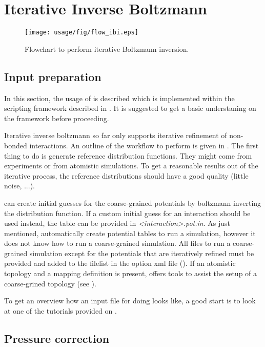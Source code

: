 \section{Iterative Inverse Boltzmann}
\begin{figure}
   \centering
   \texttt{[image: usage/fig/flow\_ibi.eps]}
   \caption{\label{fig:flow_ibi}Flowchart to perform iterative Boltzmann inversion.}
\end{figure}

\subsection{Input preparation}
In this section, the usage of \ibi is described which is implemented within the scripting framework described in . It is suggested to get a basic understaning on the framework before proceeding.

Iterative inverse boltzmann so far only supports iterative refinement of non-bonded interactions. An outline of the workflow to perform \ibi is given in . The first thing to do is generate reference distribution functions. They might come from experiments or from atomistic simulations. To get a reasonable results out of the iterative process, the reference distributions should have a good quality (little noise, ...).

\votca can create initial guesses for the coarse-grained potentials by boltzmann inverting the distribution function. If a custom initial guess for an interaction should be used instead, the table can be provided in \textit{<interaction>.pot.in}. As just mentioned, \votca automatically create potential tables to run a simulation, however it does not know how to run a coarse-grained simulation. All files to run a coarse-grained simulation except for the potentials that are iteratively refined must be provided and added to the filelist in the option xml file (). If an atomistic topology and a mapping definition is present, \votca offers tools to assist the setup of a  coarse-grined topology (see ).

To get an overview how an input file for doing \ibi looks like, a good start is to look at one of the tutorials provided on \votcaweb.

\subsection{Pressure correction}

